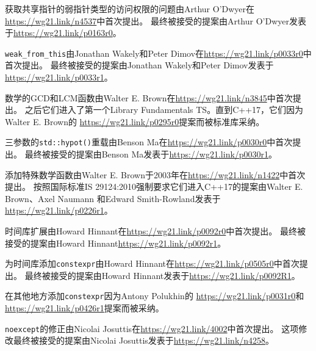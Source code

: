 获取共享指针的弱指针类型的访问权限的问题由Arthur O’Dwyer在\url{https://wg21.link/n4537}中首次提出。
最终被接受的提案由Arthur O’Dwyer发表于\url{https://wg21.link/p0163r0}。

\texttt{weak\_from\_this}由Jonathan Wakely和Peter Dimov在\url{https://wg21.link/p0033r0}中首次提出。
最终被接受的提案由Jonathan Wakely和Peter Dimov发表于\url{https://wg21.link/p0033r1}。

数学的GCD和LCM函数由Walter E. Brown在\url{https://wg21.link/n3845}中首次提出。
之后它们进入了第一个Library Fundamentals TS。直到C++17，它们因为Walter E. Brown的
\url{https://wg21.link/p0295r0}提案而被标准库采纳。

三参数的\texttt{std::hypot()}重载由Benson Ma在\url{https://wg21.link/p0030r0}中首次提出。
最终被接受的提案由Benson Ma发表于\url{https://wg21.link/p0030r1}。

添加特殊数学函数由Walter E. Brown于2003年在\url{https://wg21.link/n1422}中首次提出。
按照国际标准IS 29124:2010强制要求它们进入C++17的提案由Walter E. Brown、Axel Naumann
和Edward Smith-Rowland发表于\url{https://wg21.link/p0226r1}。

时间库扩展由Howard Hinnant在\url{https://wg21.link/p0092r0}中首次提出。
最终被接受的提案由Howard Hinnant\url{https://wg21.link/p0092r1}。

为时间库添加\texttt{constexpr}由Howard Hinnant在\url{https://wg21.link/p0505r0}中首次提出。
最终被接受的提案由Howard Hinnant发表于\url{https://wg21.link/p0092R1}。

在其他地方添加\texttt{constexpr}因为Antony Polukhin的
\url{https://wg21.link/p0031r0}和\url{https://wg21.link/p0426r1}提案而被采纳。

\texttt{noexcept}的修正由Nicolai Josuttis在\url{https://wg21.link/4002}中首次提出。
这项修改最终被接受的提案由Nicolai Josuttis发表于\url{https://wg21.link/n4258}。